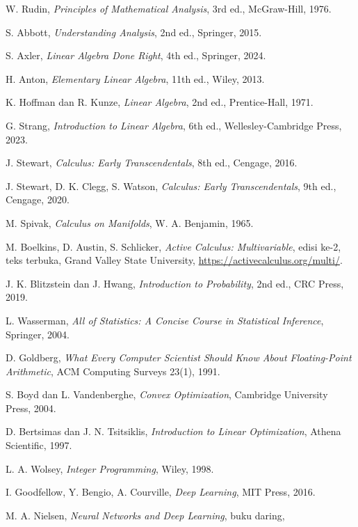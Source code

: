 \documentclass[11pt,a4paper,oneside]{book}
\theoremstyle{definition}
\theoremstyle{plain}
\theoremstyle{remark}
\begin{document}
\begin{sloppypar}
\begin{enumerate}[label={[\arabic*]},leftmargin=1.8em]
  \item W. Rudin, \emph{Principles of Mathematical Analysis}, 3rd ed.,
        McGraw-Hill, 1976.
  \item S. Abbott, \emph{Understanding Analysis}, 2nd ed., Springer, 2015.
  \item S. Axler, \emph{Linear Algebra Done Right}, 4th ed., Springer, 2024.
  \item H. Anton, \emph{Elementary Linear Algebra}, 11th ed., Wiley, 2013.
  \item K. Hoffman dan R. Kunze, \emph{Linear Algebra}, 2nd ed.,
        Prentice-Hall, 1971.
  \item G. Strang, \emph{Introduction to Linear Algebra}, 6th ed.,
        Wellesley-Cambridge Press, 2023.
  \item J. Stewart, \emph{Calculus: Early Transcendentals}, 8th ed.,
        Cengage, 2016.
  \item J. Stewart, D. K. Clegg, S. Watson, \emph{Calculus: Early
        Transcendentals}, 9th ed., Cengage, 2020.
  \item M. Spivak, \emph{Calculus on Manifolds}, W. A. Benjamin, 1965.
  \item M. Boelkins, D. Austin, S. Schlicker, \emph{Active Calculus:
        Multivariable}, edisi ke-2, teks terbuka, Grand Valley State University,
        \url{https://activecalculus.org/multi/}.
  \item J. K. Blitzstein dan J. Hwang, \emph{Introduction to Probability},
        2nd ed., CRC Press, 2019.
  \item L. Wasserman, \emph{All of Statistics: A Concise Course in Statistical
        Inference}, Springer, 2004.
  \item D. Goldberg, \emph{What Every Computer Scientist Should Know About
        Floating-Point Arithmetic}, ACM Computing Surveys 23(1), 1991.
  \item S. Boyd dan L. Vandenberghe, \emph{Convex Optimization}, Cambridge
        University Press, 2004.
  \item D. Bertsimas dan J. N. Tsitsiklis, \emph{Introduction to Linear
        Optimization}, Athena Scientific, 1997.
  \item L. A. Wolsey, \emph{Integer Programming}, Wiley, 1998.
  \item I. Goodfellow, Y. Bengio, A. Courville, \emph{Deep Learning},
        MIT Press, 2016.
  \item M. A. Nielsen, \emph{Neural Networks and Deep Learning}, buku daring,

\end{enumerate}
\end{sloppypar}
\end{document}
